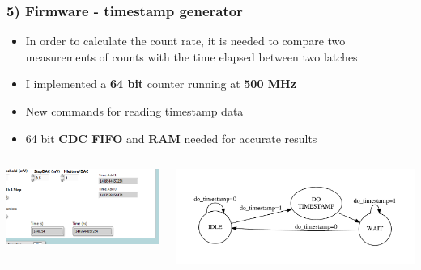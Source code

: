 \documentclass[aspectratio=169]{beamer}
\begin{document}
	\begin{frame}
		\frametitle{5) Firmware - timestamp generator}
		\begin{itemize}
			\item In order to calculate the count rate, it is needed to compare two measurements of
			counts with the time elapsed between two latches
			\item I implemented a \textbf{64 bit} counter running at \textbf{500 MHz}
			\item New commands for reading timestamp data
			\item 64 bit \textbf{CDC FIFO} and \textbf{RAM} needed for accurate results   
		\end{itemize}
		\begin{columns}		
			\begin{center}
				\includegraphics[width=0.8 \textwidth]{IMG2/fig15}
			\end{center}
			\begin{center}
				\includegraphics[width=1.0 \textwidth]{IMG2/TimestampFSM}
			\end{center}
		\end{columns}
	\end{frame}
\end{document}
